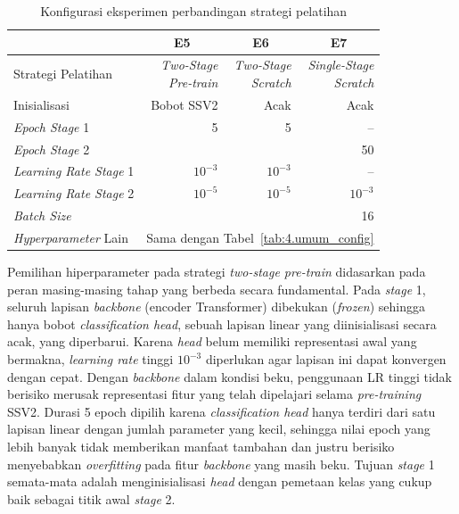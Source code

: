 \begin{table}[H]
\centering
\caption{Konfigurasi eksperimen perbandingan strategi pelatihan}
\label{tab:4.s2_config}
{\setlength{\tabcolsep}{3pt}
\footnotesize
\begin{tabular}{|l|r|r|r|}
\hline
\rowcolor{gray!15} \multicolumn{1}{|l|}{\textbf{Parameter}} & \multicolumn{1}{c|}{\cellcolor{gray!15}\textbf{E5}} & \multicolumn{1}{c|}{\cellcolor{gray!15}\textbf{E6}} & \multicolumn{1}{c|}{\cellcolor{gray!15}\textbf{E7}} \\
\hline
Strategi Pelatihan & \makecell[l]{\textit{Two-Stage}\\\textit{Pre-train}} & \makecell[l]{\textit{Two-Stage}\\\textit{Scratch}} & \makecell[l]{\textit{Single-Stage}\\\textit{Scratch}} \\
\hline
Inisialisasi & Bobot SSV2 & Acak & Acak \\
\hline
\textit{Epoch Stage} 1 & 5 & 5 & {--} \\
\hline
\textit{Epoch Stage} 2 & \multicolumn{3}{r|}{50} \\
\hline
\textit{Learning Rate Stage} 1 & $10^{-3}$ & $10^{-3}$ & {--} \\
\hline
\textit{Learning Rate Stage} 2 & $10^{-5}$ & $10^{-5}$ & $10^{-3}$ \\
\hline
\textit{Batch Size} & \multicolumn{3}{r|}{16} \\
\hline
\textit{Hyperparameter} Lain & \multicolumn{3}{c|}{Sama dengan Tabel~\ref{tab:4.umum_config}} \\
\hline
\end{tabular}
}
\end{table}

Pemilihan hiperparameter pada strategi \textit{two-stage pre-train} didasarkan pada peran masing-masing tahap yang berbeda secara fundamental. Pada \textit{stage} 1, seluruh lapisan \textit{backbone} (encoder Transformer) dibekukan (\textit{frozen}) sehingga hanya bobot \textit{classification head}, sebuah lapisan linear yang diinisialisasi secara acak, yang diperbarui. Karena \textit{head} belum memiliki representasi awal yang bermakna, \textit{learning rate} tinggi $10^{-3}$ diperlukan agar lapisan ini dapat konvergen dengan cepat. Dengan \textit{backbone} dalam kondisi beku, penggunaan LR tinggi tidak berisiko merusak representasi fitur yang telah dipelajari selama \textit{pre-training} SSV2. Durasi 5 epoch dipilih karena \textit{classification head} hanya terdiri dari satu lapisan linear dengan jumlah parameter yang kecil, sehingga nilai epoch yang lebih banyak tidak memberikan manfaat tambahan dan justru berisiko menyebabkan \textit{overfitting} pada fitur \textit{backbone} yang masih beku. Tujuan \textit{stage} 1 semata-mata adalah menginisialisasi \textit{head} dengan pemetaan kelas yang cukup baik sebagai titik awal \textit{stage} 2.

